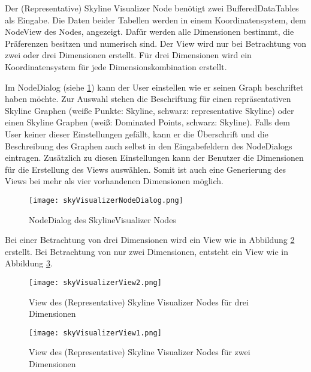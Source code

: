 Der (Representative) Skyline Visualizer Node benötigt zwei BufferedDataTables als Eingabe. Die Daten beider Tabellen werden in einem Koordinatensystem, dem NodeView des Nodes, angezeigt. Dafür werden alle Dimensionen bestimmt, die Präferenzen besitzen und numerisch sind. Der View wird nur bei Betrachtung von zwei oder drei Dimensionen erstellt. Für drei Dimensionen wird ein Koordinatensystem für jede Dimensionskombination erstellt.

Im NodeDialog (siehe \ref{img:skyVisualizerNodeDialog}) kann der User einstellen wie er seinen Graph beschriftet haben möchte. Zur Auswahl stehen die Beschriftung für einen repräsentativen Skyline Graphen (weiße Punkte: Skyline, schwarz: representative Skyline) oder einen Skyline Graphen (weiß: Dominated Points, schwarz: Skyline). Falls dem User keiner dieser Einstellungen gefällt, kann er die Überschrift und die Beschreibung des Graphen auch selbst in den Eingabefeldern des NodeDialogs eintragen. Zusätzlich zu diesen Einstellungen kann der Benutzer die Dimensionen für die Erstellung des Views auswählen. Somit ist auch eine Generierung des Views bei mehr als vier vorhandenen Dimensionen möglich.

\begin{figure}[H]
	\centering
	\texttt{[image: skyVisualizerNodeDialog.png]}
	\caption{NodeDialog des SkylineVisualizer Nodes}
	\label{img:skyVisualizerNodeDialog}
\end{figure}

Bei einer Betrachtung von drei Dimensionen wird ein View wie in Abbildung \ref{img:skyVisiualizerView2} erstellt. Bei Betrachtung von nur zwei Dimensionen, entsteht ein View wie in Abbildung \ref{img:skyVisiualizerView1}.

\begin{figure}[H]
	\centering
	\texttt{[image: skyVisualizerView2.png]}
	\caption{View des (Representative) Skyline Visualizer Nodes für drei Dimensionen}
	\label{img:skyVisiualizerView2}
\end{figure}

\begin{figure}[H]
	\centering
	\texttt{[image: skyVisualizerView1.png]}
	\caption{View des (Representative) Skyline Visualizer Nodes für zwei Dimensionen}
	\label{img:skyVisiualizerView1}
\end{figure}
